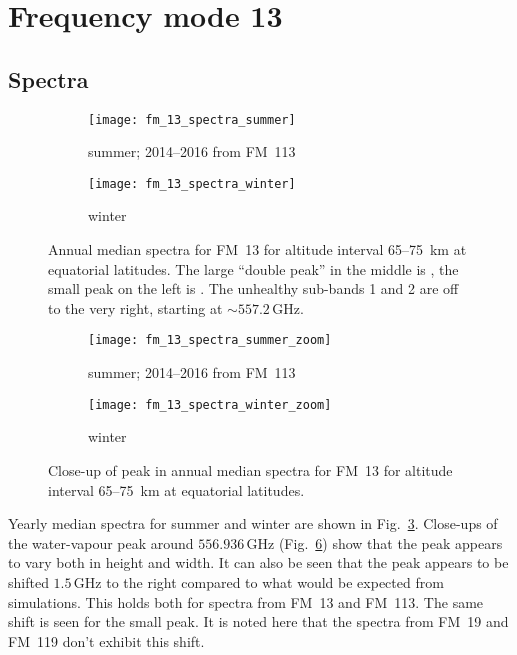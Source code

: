 \section{Frequency mode 13}
\label{FM13}

\subsection{Spectra}
\label{FM13:spectra}

\begin{figure}[ht]
    \centering
    \begin{subfigure}[b]{0.9545\textwidth}
        \texttt{[image: fm\_13\_spectra\_summer]}
        \caption{summer; 2014--2016 from FM~113}\label{fig:spectra:13:summer}
    \end{subfigure}
    \begin{subfigure}[b]{0.9545\textwidth}
        \texttt{[image: fm\_13\_spectra\_winter]}
        \caption{winter}\label{fig:spectra:13:winter}
    \end{subfigure}
    \caption{Annual median spectra for FM~13 for altitude interval 65--75~km at
        equatorial latitudes. The large ``double peak'' in the middle is
        , the small peak on the left is . The unhealthy
        sub-bands 1 and 2 are off to the very right, starting at
        $\sim557.2\,\mathrm{GHz}$.}\label{fig:spectra:13}
\end{figure}

\begin{figure}[ht]
    \centering
    \begin{subfigure}[b]{0.9545\textwidth}
        \texttt{[image: fm\_13\_spectra\_summer\_zoom]}
        \caption{summer; 2014--2016 from
            FM~113}\label{fig:spectra:13:summer:closeup}
    \end{subfigure}
    \begin{subfigure}[b]{0.9545\textwidth}
        \texttt{[image: fm\_13\_spectra\_winter\_zoom]}
        \caption{winter}\label{fig:spectra:13:winter:closeup}
    \end{subfigure}
    \caption{Close-up of  peak in annual median spectra for
        FM~13 for altitude interval 65--75~km at equatorial latitudes.
        }\label{fig:spectra:13:closeup}
\end{figure}

\noindent
Yearly median spectra for summer and winter are shown in
Fig.~\ref{fig:spectra:13}. Close-ups of the water-vapour peak around
$556.936\,\mathrm{GHz}$ (Fig.~\ref{fig:spectra:13:closeup}) show that the peak
appears to vary both in height and width. It can also be seen that the peak
appears to be shifted $1.5\,\mathrm{GHz}$ to the right compared to what would
be expected from simulations. This holds both for spectra from FM~13 and
FM~113. The same shift is seen for the small  peak. It is noted here
that the spectra from FM~19 and FM~119 don't exhibit this shift.


